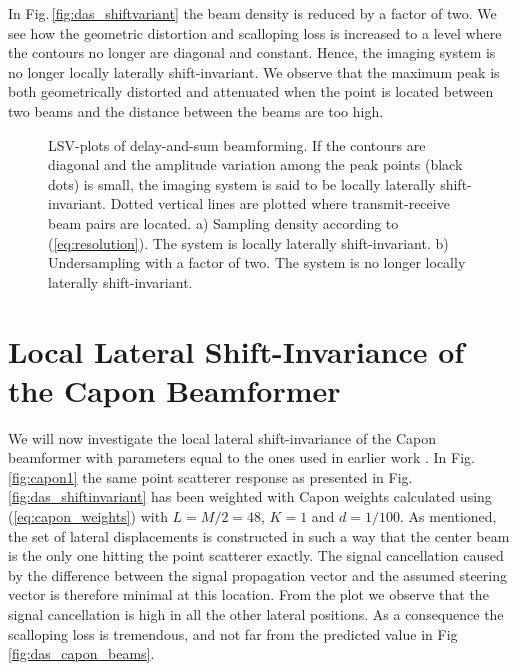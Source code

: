 \documentclass[journal]{IEEEtran}
\newcommand{\img}{img/}
\begin{document}
In Fig.\,\ref{fig:das_shiftvariant} the beam density is reduced by a factor of two. We see how the geometric distortion and scalloping loss is increased to a level where the contours no longer are diagonal and constant. Hence, the imaging system is no longer locally laterally shift-invariant. We observe that the maximum peak is both geometrically distorted and attenuated when the point is located between two beams and the distance between the beams are too high.

\begin{figure}[!t]
\centerline{
\hfill{}
}
\caption{LSV-plots of delay-and-sum beamforming. If the contours are diagonal and the amplitude variation among the peak points (black dots) is small, the imaging system is said to be locally laterally shift-invariant. Dotted vertical lines are plotted where transmit-receive beam pairs are located. a) Sampling density according to (\ref{eq:resolution}). The system is locally laterally shift-invariant. b) Undersampling with a factor of two. The system is no longer locally laterally shift-invariant.}
\label{fig:das}
\end{figure}

\section{Local Lateral Shift-Invariance of the Capon Beamformer}\label{sec:capon_LLSI}
We will now investigate the local lateral shift-invariance of the Capon beamformer with parameters equal to the ones used in earlier work \cite{Synnevag2009, Asen}. In Fig.\,\ref{fig:capon1} the same point scatterer response as presented in Fig.\,\ref{fig:das_shiftinvariant} has been weighted with Capon weights calculated using (\ref{eq:capon_weights}) with $L = M/2 = 48$, $K=1$ and $d=1/100$. As mentioned, the set of lateral displacements is constructed in such a way that the center beam is the only one hitting the point scatterer exactly. The signal cancellation caused by the difference between the signal propagation vector and the assumed steering vector is therefore minimal at this location. From the plot we observe that the signal cancellation is high in all the other lateral positions. As a consequence the scalloping loss is tremendous, and not far from the predicted value in Fig\,\ref{fig:das_capon_beams}. %
\end{document}
